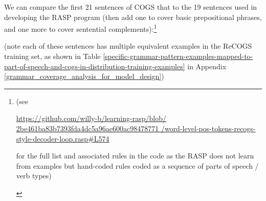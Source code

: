 \documentclass[11pt]{article}
\begin{document}
We can compare the first 21 sentences of COGS that to the 19 sentences used in developing the RASP program (then add one to cover basic prepositional phrases, and one more to cover sentential complements):\footnote{\begin{footnotesize}(see 

\href{https://github.com/willy-b/learning-rasp/blob/2be461ba83b7393fda4dc5a96ae600ac98478771/word-level-pos-tokens-recogs-style-decoder-loop.rasp\#L574}{https://github.com/willy-b/learning-rasp/blob/
2be461ba83b7393fda4dc5a96ae600ac98478771
/word-level-pos-tokens-recogs-style-decoder-loop.rasp\#L574}

for the full list and associated rules in the code as the RASP does not learn from examples but hand-coded rules coded as a sequence of parts of speech / verb types)\end{footnotesize}}

(note each of these sentences has multiple equivalent examples in the ReCOGS training set, as shown in Table \ref{specific-grammar-pattern-examples-mapped-to-part-of-speech-and-cogs-in-distribution-training-examples} in Appendix \ref{grammar_coverage_analysis_for_model_design})
\end{document}
